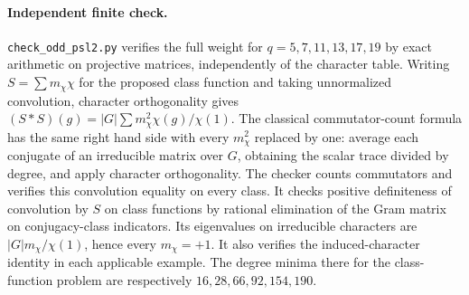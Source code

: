 \paragraph{Independent finite check.}
\texttt{check\_odd\_psl2.py} verifies the full weight for $q=5,7,11,13,17,19$ by exact arithmetic on projective matrices, independently of the character table. Writing $S=\sum m_\chi\chi$ for the proposed class function and taking unnormalized convolution, character orthogonality gives $(S*S)(g)=|G|\sum m_\chi^2\chi(g)/\chi(1)$. The classical commutator-count formula has the same right hand side with every $m_\chi^2$ replaced by one: average each conjugate of an irreducible matrix over $G$, obtaining the scalar trace divided by degree, and apply character orthogonality. The checker counts commutators and verifies this convolution equality on every class. It checks positive definiteness of convolution by $S$ on class functions by rational elimination of the Gram matrix on conjugacy-class indicators. Its eigenvalues on irreducible characters are $|G|m_\chi/\chi(1)$, hence every $m_\chi=+1$. It also verifies the induced-character identity in each applicable example. The degree minima there for the class-function problem are respectively $16,28,66,92,154,190$.
